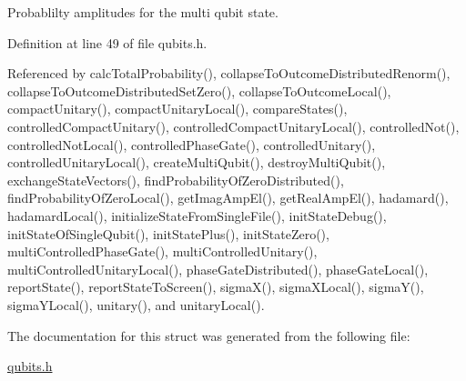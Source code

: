 Probablilty amplitudes for the multi qubit state. 

Definition at line 49 of file qubits.h.

Referenced by calcTotalProbability(), collapseToOutcomeDistributedRenorm(), collapseToOutcomeDistributedSetZero(), collapseToOutcomeLocal(), compactUnitary(), compactUnitaryLocal(), compareStates(), controlledCompactUnitary(), controlledCompactUnitaryLocal(), controlledNot(), controlledNotLocal(), controlledPhaseGate(), controlledUnitary(), controlledUnitaryLocal(), createMultiQubit(), destroyMultiQubit(), exchangeStateVectors(), findProbabilityOfZeroDistributed(), findProbabilityOfZeroLocal(), getImagAmpEl(), getRealAmpEl(), hadamard(), hadamardLocal(), initializeStateFromSingleFile(), initStateDebug(), initStateOfSingleQubit(), initStatePlus(), initStateZero(), multiControlledPhaseGate(), multiControlledUnitary(), multiControlledUnitaryLocal(), phaseGateDistributed(), phaseGateLocal(), reportState(), reportStateToScreen(), sigmaX(), sigmaXLocal(), sigmaY(), sigmaYLocal(), unitary(), and unitaryLocal().

The documentation for this struct was generated from the following file:\begin{DoxyCompactItemize}
\item 
\hyperlink{qubits_8h}{qubits.h}\end{DoxyCompactItemize}
